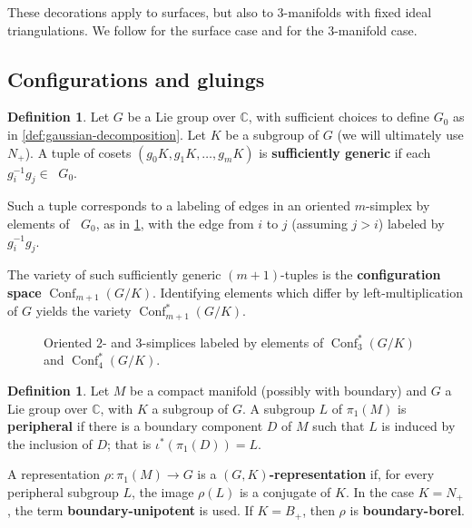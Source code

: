 \documentclass{amsart}
\theoremstyle{plain}
\theoremstyle{definition}
\newtheorem{definition}[theorem]{Definition}
\theoremstyle{remark}
\newcommand{\defined}[1]{\textbf{#1}}
\newcommand{\lifttoG}[1]{{\mathop{\overline{#1}}}}
\DeclareMathOperator{\Conf}{Conf}
\begin{document}
  These decorations apply to surfaces, but also to $3$-manifolds with
  fixed ideal triangulations. We follow \cite{fockgoncharov2006} for the
  surface case and \cite{zickert2016} for the $3$-manifold case.

  \subsection{Configurations and gluings}

  \label{sec:configurations-and-gluings}

  \begin{definition}
    \label{def:Conf_k_star}
    Let $G$ be a Lie group over $\mathbb{C}$, with sufficient choices to
    define $G_0$ as in \cref{def:gaussian-decomposition}. Let $K$ be a
    subgroup of $G$ (we will ultimately use $N_{+}$). A tuple of cosets
    $(g_0K, g_1K, \dotsc, g_{m}K)$ is \defined{sufficiently generic} if
    each $g_i^{-1} g_j \in \lifttoG{w_0}G_0$.

    Such a tuple corresponds to a labeling of edges in an oriented
    $m$-simplex by elements of $\lifttoG{w_0}G_0$, as in
    \cref{fig:labeled-sufficiently-generic-simplex}, with the edge from
    $i$ to $j$ (assuming $j>i$) labeled by $g_i^{-1} g_j$.

    The variety of such sufficiently generic $(m+1)$-tuples is the
    \defined{configuration space} $\Conf_{m+1}(G/K)$. Identifying
    elements which differ by left-multiplication of $G$ yields the
    variety $\Conf_{m+1}^{\ast}(G/K)$.
  \end{definition}

  \begin{figure}[h]
    \centering 

    \caption{Oriented $2$- and $3$-simplices labeled by elements of
      $\Conf_3^{\ast}(G/K)$ and $\Conf_4^{\ast}(G/K)$.
      \label{fig:labeled-sufficiently-generic-simplex}
    }
  \end{figure}

  \begin{definition}
    \label{def:peripheral-stuff}
    Let $M$ be a compact manifold (possibly with boundary) and $G$ a Lie
    group over $\mathbb{C}$, with $K$ a subgroup of $G$. A subgroup $L$
    of $\pi_1(M)$ is \defined{peripheral} if there is a boundary
    component $D$ of $M$ such that $L$ is induced by the inclusion of
    $D$; that is $\iota^{\ast}(\pi_1(D)) = L$.

    A representation $\rho : \pi_1(M) \to G$ is a
    \defined{$(G,K)$-representation} if, for every peripheral subgroup
    $L$, the image $\rho(L)$ is a conjugate of $K$. In the case $K =
    N_{+}$, the term \defined{boundary-unipotent} is used. If $K =
    B_{+}$, then $\rho$ is \defined{boundary-borel}.
  \end{definition}
\end{document}
